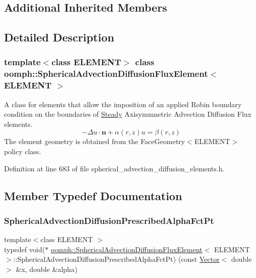 \subsection*{Additional Inherited Members}


\subsection{Detailed Description}
\subsubsection*{template$<$class E\+L\+E\+M\+E\+NT$>$\newline
class oomph\+::\+Spherical\+Advection\+Diffusion\+Flux\+Element$<$ E\+L\+E\+M\+E\+N\+T $>$}

A class for elements that allow the imposition of an applied Robin boundary condition on the boundaries of \hyperlink{classoomph_1_1Steady}{Steady} Axisymmnetric Advection Diffusion Flux elements. \[ -\Delta u \cdot \mathbf{n} + \alpha(r,z) u = \beta(r,z) \] The element geometry is obtained from the Face\+Geometry$<$\+E\+L\+E\+M\+E\+N\+T$>$ policy class. 

Definition at line 683 of file spherical\+\_\+advection\+\_\+diffusion\+\_\+elements.\+h.



\subsection{Member Typedef Documentation}
\mbox{\label{classoomph_1_1SphericalAdvectionDiffusionFluxElement_aabc503a4eeac639334283e7297b88423}} 
\subsubsection{\texorpdfstring{Spherical\+Advection\+Diffusion\+Prescribed\+Alpha\+Fct\+Pt}{SphericalAdvectionDiffusionPrescribedAlphaFctPt}}
{\footnotesize\ttfamily template$<$class E\+L\+E\+M\+E\+NT $>$ \\
typedef void($\ast$ \hyperlink{classoomph_1_1SphericalAdvectionDiffusionFluxElement}{oomph\+::\+Spherical\+Advection\+Diffusion\+Flux\+Element}$<$ E\+L\+E\+M\+E\+NT $>$\+::Spherical\+Advection\+Diffusion\+Prescribed\+Alpha\+Fct\+Pt) (const \hyperlink{classoomph_1_1Vector}{Vector}$<$ double $>$ \&x, double \&alpha)}



